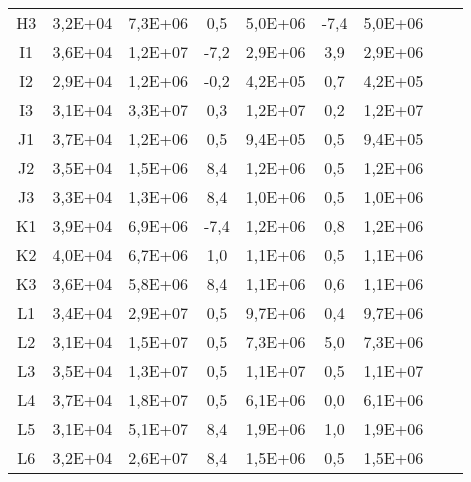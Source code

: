 \begin{center}
\begin{longtable}{ccccccccc}
H3    & 3,2E+04 & 7,3E+06 & 0,5   & 5,0E+06 & -7,4  & 5,0E+06 \\
I1    & 3,6E+04 & 1,2E+07 & -7,2  & 2,9E+06 & 3,9   & 2,9E+06 \\
I2    & 2,9E+04 & 1,2E+06 & -0,2  & 4,2E+05 & 0,7   & 4,2E+05 \\
I3    & 3,1E+04 & 3,3E+07 & 0,3   & 1,2E+07 & 0,2   & 1,2E+07 \\
J1    & 3,7E+04 & 1,2E+06 & 0,5   & 9,4E+05 & 0,5   & 9,4E+05 \\
J2    & 3,5E+04 & 1,5E+06 & 8,4   & 1,2E+06 & 0,5   & 1,2E+06 \\
J3    & 3,3E+04 & 1,3E+06 & 8,4   & 1,0E+06 & 0,5   & 1,0E+06 \\
K1    & 3,9E+04 & 6,9E+06 & -7,4  & 1,2E+06 & 0,8   & 1,2E+06 \\
K2    & 4,0E+04 & 6,7E+06 & 1,0   & 1,1E+06 & 0,5   & 1,1E+06 \\
K3    & 3,6E+04 & 5,8E+06 & 8,4   & 1,1E+06 & 0,6   & 1,1E+06 \\
L1    & 3,4E+04 & 2,9E+07 & 0,5   & 9,7E+06 & 0,4   & 9,7E+06 \\
L2    & 3,1E+04 & 1,5E+07 & 0,5   & 7,3E+06 & 5,0   & 7,3E+06 \\
L3    & 3,5E+04 & 1,3E+07 & 0,5   & 1,1E+07 & 0,5   & 1,1E+07 \\
L4    & 3,7E+04 & 1,8E+07 & 0,5   & 6,1E+06 & 0,0   & 6,1E+06 \\
L5    & 3,1E+04 & 5,1E+07 & 8,4   & 1,9E+06 & 1,0   & 1,9E+06 \\
L6    & 3,2E+04 & 2,6E+07 & 8,4   & 1,5E+06 & 0,5   & 1,5E+06 \\
\end{longtable}
\end{center}

